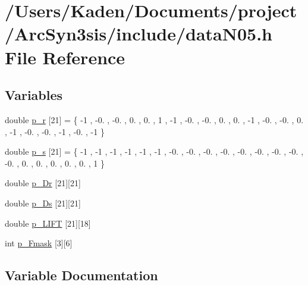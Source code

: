 \hypertarget{a00518}{}\section{/\+Users/\+Kaden/\+Documents/project/\+Arc\+Syn3sis/include/data\+N05.h File Reference}
\label{a00518}
\subsection*{Variables}
\begin{DoxyCompactItemize}
\item 
double \hyperlink{a00518_af8a639c6d56c6c59b53ab16bd5443ad3}{p\+\_\+r} \mbox{[}21\mbox{]} = \{ -\/1 , -\/0. , -\/0. , 0. , 0. , 1 , -\/1 , -\/0. , -\/0. , 0. , 0. , -\/1 , -\/0. , -\/0. , 0. , -\/1 , -\/0. , -\/0. , -\/1 , -\/0. , -\/1 \}
\item 
double \hyperlink{a00518_a295d4d2ca6c95434189f910437724471}{p\+\_\+s} \mbox{[}21\mbox{]} = \{ -\/1 , -\/1 , -\/1 , -\/1 , -\/1 , -\/1 , -\/0. , -\/0. , -\/0. , -\/0. , -\/0. , -\/0. , -\/0. , -\/0. , -\/0. , 0. , 0. , 0. , 0. , 0. , 1 \}
\item 
double \hyperlink{a00518_a159b65e1eedb296de62af88df5ff0c4f}{p\+\_\+\+Dr} \mbox{[}21\mbox{]}\mbox{[}21\mbox{]}
\item 
double \hyperlink{a00518_ae5879986c23478332a7ea6d4ec0bd535}{p\+\_\+\+Ds} \mbox{[}21\mbox{]}\mbox{[}21\mbox{]}
\item 
double \hyperlink{a00518_af675a8dc393fa5980f6736a9b66361f2}{p\+\_\+\+L\+I\+FT} \mbox{[}21\mbox{]}\mbox{[}18\mbox{]}
\item 
int \hyperlink{a00518_a7556b1136ab46bbbbfda80a1ffcff11f}{p\+\_\+\+Fmask} \mbox{[}3\mbox{]}\mbox{[}6\mbox{]}
\end{DoxyCompactItemize}


\subsection{Variable Documentation}
\mbox{\label{a00518_a159b65e1eedb296de62af88df5ff0c4f}} 
